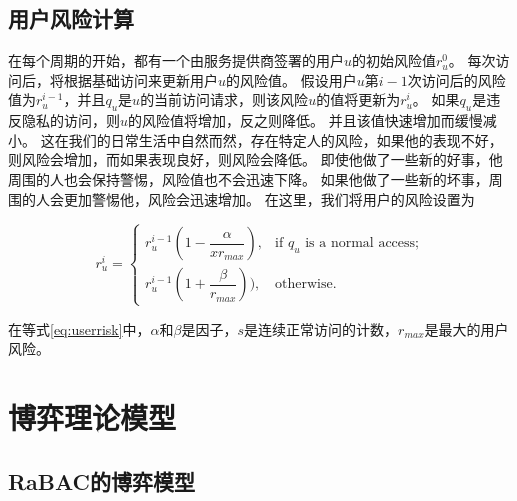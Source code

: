 \subsection{用户风险计算}

在每个周期的开始，都有一个由服务提供商签署的用户${u}$的初始风险值${r_u ^ 0}$。 每次访问后，将根据基础访问来更新用户${u}$的风险值。 假设用户${u}$第${{i-1}}$次访问后的风险值为${r_u ^ {i-1}}$，并且${q_u}$是${u}$的当前访问请求，则该风险$ {u}$的值将更新为${r_u ^ {i}}$。 如果${q_u}$是违反隐私的访问，则${u}$的风险值将增加，反之则降低。 并且该值快速增加而缓慢减小。 这在我们的日常生活中自然而然，存在特定人的风险，如果他的表现不好，则风险会增加，而如果表现良好，则风险会降低。 即使他做了一些新的好事，他周围的人也会保持警惕，风险值也不会迅速下降。 如果他做了一些新的坏事，周围的人会更加警惕他，风险会迅速增加。 在这里，我们将用户的风险设置为

\begin{equation}\label{eq:userrisk}
r_u^{i}=\left\{ 
\begin{array}{cl}
r_u^{i-1}(1-\dfrac{\alpha}{xr_{max}}), & \text{if } q_u \text{ is a normal access;}\\
r_u^{i-1}(1+\dfrac{\beta}{r_{max}})), & \text{otherwise.}
\end{array}
\right.
\end{equation}

在等式\ref{eq:userrisk}中，$\alpha$和$\beta$是因子，$s$是连续正常访问的计数，$r_{max}$是最大的用户风险。

\section{博弈理论模型}
\label{sec:gamemodel}

\subsection{RaBAC的博弈模型}

